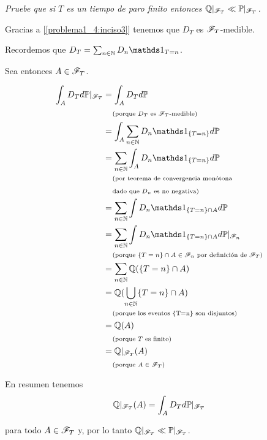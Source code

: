 \emph{
	Pruebe que si $T$ es un tiempo de paro finito 
	entonces $ \mathbb{Q} |_{\mathscr{F}_T}\ll \mathbb{P} |_{\mathscr{F}_T}$.
}

\afterstatement\pn

Gracias a [\ref{problema1_4:inciso3}] tenemos que $D_T$ es $\mathscr{F}_T$-medible.\pn

Recordemos que $D_T = \sum_{n \in \N} D_n \indic_{T = n}$.\pn

Sea entonces $A \in \mathscr{F}_T$.

\begin{align}
        \int_A D_T d\P|_{\F_T}  &=  \int_A D_T d\P                                                      \\
                                &\comment{porque $D_T$ es $\F_T$-medible}                               \\
                                &=  \int_A \sum_{n \in \N} D_n \indic_{\{T = n\}} d\P                   \\
                                &=  \sum_{n \in \N} \int_A D_n \indic_{\{T = n\}} d\P                   \\
                                &\lcomment{por teorema de convergencia monótona}                        \\
                                &\rcomment{dado que $D_n$ es no negativa}                               \\
                                &=  \sum_{n \in \N} \int D_n \indic_{\{T = n\} \cap A} d\P              \\
                                &=  \sum_{n \in \N} \int D_n \indic_{\{T = n\} \cap A} d\P|_{\F_n}      \\
                                &\comment{porque $\{T = n\} \cap A \in \F_n$ por definición de $\F_T$}  \\
                                &=  \sum_{n \in \N} \Q(\{T = n\} \cap A)                                \\                                
                                &=   \Q(\bigcup_{n \in \N} \{T = n\} \cap A)                            \\
                                &\comment{porque los eventos \{T=n\} son disjuntos}                     \\
                                &=   \Q(A)                                                              \\
                                &\comment{porque $T$ es finito}                                         \\
                                &=   \Q|_{\F_T}(A)                                                      \\
                                &\comment{porque $A \in \F_T$}
\end{align}

En resumen tenemos
\begin{align}
    \mathbb{Q}|_{\mathscr{F}_T}(A) = \int_A D_T d\mathbb{P}|_{\mathscr{F}_T}
\end{align}

para todo $A \in \mathscr{F}_T$ y, por lo tanto $\mathbb{Q}|_{\mathscr{F}_T} \ll \mathbb{P}|_{\mathscr{F}_T}$.